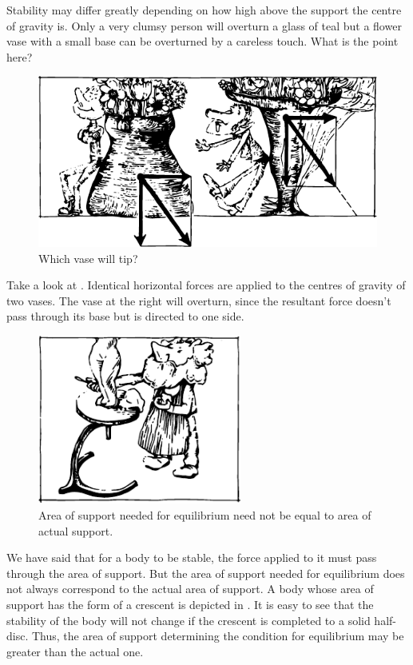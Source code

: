 Stability may differ greatly depending on how high above the support the centre of gravity is. Only a very clumsy person will overturn a glass of teal but a flower vase with a small base can be overturned by a careless touch. What is the point here?
 \begin{figure}[!ht]
 \centering
 \includegraphics[width=\textwidth]{figures/fig-5-10.pdf}
 \caption{Which vase will tip?}
 \label{fig-5-10}
 \end{figure}
Take a look at . Identical horizontal forces are applied to the centres of gravity of two vases. The vase at the right will overturn, since the resultant force doesn't pass through its base but is directed to one side.
 \begin{figure}[!ht]
 \centering
 \includegraphics[width=0.6\textwidth]{figures/fig-5-11.pdf}
 \caption{Area of support needed for equilibrium need not be equal to area of actual support.}
 \label{fig-5-11}
 \end{figure}
We have said that for a body to be stable, the force applied to it must pass through the area of support. But the area of support needed for equilibrium does not always correspond to the actual area of support. A body whose area of support has the form of a crescent is depicted in . It is easy to see that the stability of the body will not change if the crescent is completed to a solid half-disc. Thus, the area of support determining the condition for equilibrium may be greater than the actual one.

